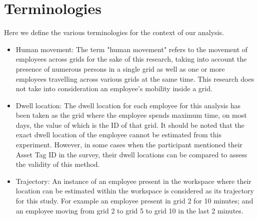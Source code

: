 \documentclass[acmtog]{acmart}
\begin{document}


\section{Terminologies}
Here we define the various terminologies for the context of our analysis. 
\begin{itemize}
    \item Human movement: The term "human movement" refers to the movement of employees across grids for the sake of this research, taking into account the presence of numerous persons in a single grid as well as one or more employees travelling across various grids at the same time. This research does not take into consideration an employee's mobility inside a grid.
    \item Dwell location: The dwell location for each employee for this analysis has been taken as the grid where the employee spends maximum time, on most days, the value of which is the ID of that grid. It should be noted that the exact dwell location of the employee cannot be estimated from this experiment. However, in some cases when the participant mentioned their Asset Tag ID in the survey, their dwell locations can be compared to assess the validity of this method.
    \item Trajectory: An instance of an employee present in the workspace where their location can be estimated within the workspace is considered as its trajectory for this study. For example an employee present in grid 2 for 10 minutes; and an employee moving from grid 2 to grid 5 to grid 10 in the last 2 minutes.
  
\end{itemize}


\end{document}

